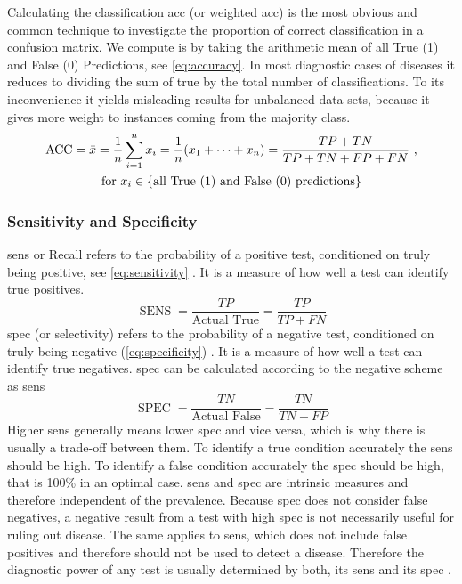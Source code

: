 Calculating the classification \acrfull{acc} (or weighted \acrshort{acc}) is the most obvious and common technique to investigate the proportion of correct classification in a confusion matrix. We compute is by taking the arithmetic mean of all True (1) and False (0) Predictions, see \cref{eq:accuracy}. In most diagnostic cases of diseases it reduces to dividing the sum of true by the total number of classifications. To its inconvenience it yields misleading results for unbalanced data sets, because it gives more weight to instances coming from the majority class.
\begin{equation}
    \begin{gathered}
        \operatorname{ACC} = \bar{x} = \frac{1}{n}\sum_{i=1}^n x_i  =  \frac{1}{n} (x_1 + \cdots + x_n) = \frac{TP + TN}{TP + TN + FP + FN} \textnormal{ ,}\\
        \textnormal{for } x_i \in \{\textnormal{all True (1) and False (0) predictions}\} \\
    \end{gathered}
    \label{eq:accuracy}
\end{equation}

\subsubsection{Sensitivity and Specificity}

\Acrfull{sens} or Recall refers to the probability of a positive test, conditioned on truly being positive, see \cref{eq:sensitivity} \cite{JacobYerushalmy.1947}. It is a measure of how well a test can identify true positives.
\begin{equation}
    \operatorname{SENS} = \frac{TP}{ \text{Actual True}} = \frac{TP}{TP + FN}
    \label{eq:sensitivity}
\end{equation}
\Acrfull{spec} (or selectivity) refers to the probability of a negative test, conditioned on truly being negative (\cref{eq:specificity}) \cite{JacobYerushalmy.1947}. It is a measure of how well a test can identify true negatives. \acrshort{spec} can be calculated according to the negative scheme as \acrshort{sens}
\begin{equation}
    \operatorname{SPEC} = \frac{TN}{ \text{Actual False}} = \frac{TN}{TN + FP}
    \label{eq:specificity}
\end{equation}
Higher \acrshort{sens} generally means lower \acrshort{spec} and vice versa, which is why there is usually a trade-off between them. To identify a true condition accurately the \acrshort{sens} should be high. To identify a false condition accurately the \acrshort{spec} should be high, that is 100\% in an optimal case. \acrshort{sens} and \acrshort{spec} are intrinsic measures and therefore independent of the prevalence. Because \acrshort{spec} does not consider false negatives, a negative result from a test with high \acrshort{spec} is not necessarily useful for ruling out disease. The same applies to \acrshort{sens}, which does not include false positives and therefore should not be used to detect a disease. Therefore the diagnostic power of any test is usually determined by both, its \acrshort{sens} and its \acrshort{spec} \cite{Boyko.1994}.

